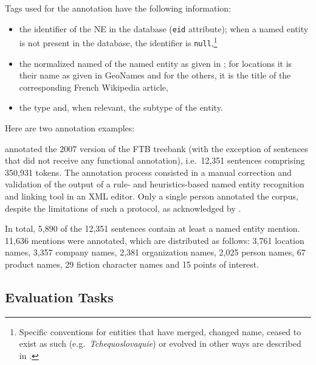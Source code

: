 Tags used for the annotation have the following information:
\begin{itemize}
    \item the identifier of the NE in the \aleda database (\texttt{eid} attribute); when a named entity is not present in the database, the identifier is \texttt{null},\footnote{Specific conventions for entities that have merged, changed name, ceased to exist as such (e.g.~\emph{Tchequoslovaquie}) or evolved in other ways are described in .}
    \item the normalized named of the named entity as given in \aleda; for locations it is their name as given in GeoNames and for the others, it is the title of the corresponding French Wikipedia article,
    \item the type and, when relevant, the subtype of the entity.
\end{itemize}
Here are two annotation examples:\\

 annotated the 2007 version of the FTB treebank (with the exception of sentences that did not receive any functional annotation), i.e.~12,351 sentences comprising 350,931 tokens. The annotation process consisted in a manual correction and validation of the output of a rule- and heuristics-based named entity recognition and linking tool in an XML editor.
Only a single person annotated the corpus, despite the limitations of such a protocol, as acknowledged by .

In total, 5,890 of the 12,351 sentences contain at least a named entity mention. 11,636 mentions were annotated, which are distributed as follows:
3,761 location names, 3,357 company names, 2,381 organization names, 2,025 person names, 67 product names, 29 fiction character names and 15 points of interest.

\subsection{Evaluation Tasks}\label{MethodEVAL}


